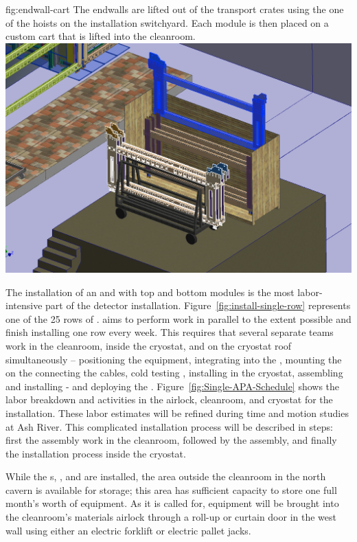 \begin{dunefigure}{fig:endwall-cart}
  {The endwalls are lifted out of the transport crates using the one of the hoists on the installation switchyard. Each module is then placed on a custom cart that is lifted into the cleanroom.}
\includegraphics[width=.5\textwidth]{graphics/endwall-cart.png}
\end{dunefigure}




The installation of an  and   with top and bottom  modules is the most labor-intensive part of the detector installation. Figure~\ref{fig:install-single-row} represents one of the 25 rows of .   aims to perform work in parallel to the extent possible and finish installing one row every week. 
This requires that several separate teams work in the cleanroom, inside the cryostat, and on the cryostat roof simultaneously --  positioning the equipment, integrating  into the , mounting the   on the  connecting the cables, cold testing , installing  in the cryostat, assembling and installing - and deploying the .
Figure~\ref{fig:Single-APA-Schedule} shows the labor breakdown and activities in the airlock,  cleanroom, and cryostat for the  installation. These labor estimates will be refined during time and motion studies at Ash River. %
This complicated installation process will be described in steps: first the  assembly work in the cleanroom, %
followed by the  assembly, and %
finally the installation process inside the cryostat.

While the s, , and  are installed, the area outside the cleanroom in the north cavern is available for storage; this area has sufficient capacity to store one full month's worth of equipment. As it is called for, equipment will be brought into the cleanroom's materials airlock through a roll-up or curtain door in the west wall using either an electric forklift or electric pallet jacks.

